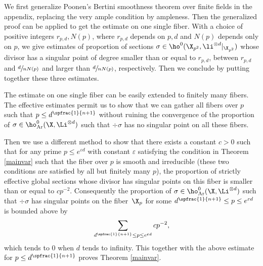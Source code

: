 We first generalize Poonen's Bertini smoothness theorem over finite fields in the appendix, replacing the very ample condition by ampleness. Then the generalized proof can be applied to get the estimate on one single fiber. With a choice of positive integers $r_{p,d},N(p)$, where $r_{p,d}$ depends on $p,d$ and $N(p)$ depends only on $p$, we give estimates of proportion of sections $\sigma\in \ho^0(\X_{p^2}, \li^{\otimes d}|_{\X_{p^2}})$ whose divisor has a singular point of degree smaller than or equal to $r_{p,d}$, between $r_{p,d}$ and $\sfrac{d}{nN(p)}$ and larger than $\sfrac{d}{nN(p)}$, respectively. Then we conclude by putting together these three estimates.

The estimate on one single fiber can be easily extended to finitely many fibers. The effective estimates permit us to show that we can gather all fibers over $p$ such that $p\leq d^{\spfrac{1}{n+1}}$ without ruining the convergence of the proportion of $\sigma \in \ho^0_{\mathrm{Ar}}(\X, \Li^{\otimes d})$ such that $\div \sigma$ has no singular point on all these fibers.

Then we use a different method to show that there exists a constant $c>0$ such that for any prime $ p \leq e^{\varepsilon d}$ with constant $\varepsilon$ satisfying the condition in Theorem \ref{mainvar} such that the fiber over $p$ is smooth and irreducible (these two conditions are satisfied by all but finitely many $p$), the proportion of strictly effective global sections whose divisor has singular points on this fiber is smaller than or equal to $cp^{-2}$. Consequently the proportion of $\sigma \in \ho^0_{\mathrm{Ar}}(\X, \Li^{\otimes d})$ such that $\div \sigma$ has singular points on the fiber~$\X_p$ for some $d^{\spfrac{1}{n+1}}\leq p \leq e^{\varepsilon d}$ is bounded above by
\[
\sum_{d^{\spfrac{1}{n+1}}\leq p \leq e^{\varepsilon d}}cp^{-2},
\]
which tends to $0$ when $d$ tends to infinity. This together with the above estimate for $p\leq d^{\spfrac{1}{n+1}}$ proves Theorem \ref{mainvar}.

